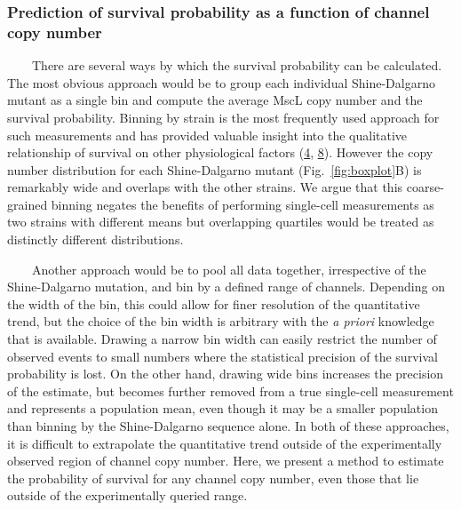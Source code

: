 \subsubsection{Prediction
of
survival
probability
as a
function
of
channel
copy
number}\label{prediction-of-survival-probability-as-a-function-of-channel-copy-number}

~~~~There
are
several
ways
by
which
the
survival
probability
can be
calculated.
The
most
obvious
approach
would
be to
group
each
individual
Shine-Dalgarno
mutant
as a
single
bin
and
compute
the
average
MscL
copy
number
and
the
survival
probability.
Binning
by
strain
is the
most
frequently
used
approach
for
such
measurements
and
has
provided
valuable
insight
into
the
qualitative
relationship
of
survival
on
other
physiological
factors
(\protect\hyperlink{ref-bialecka-fornal2015}{4},
\protect\hyperlink{ref-vandenberg2016}{8}).
However
the
copy
number
distribution
for
each
Shine-Dalgarno
mutant
(Fig.~\ref{fig:boxplot}B)
is
remarkably
wide
and
overlaps
with
the
other
strains.
We
argue
that
this
coarse-grained
binning
negates
the
benefits
of
performing
single-cell
measurements
as two
strains
with
different
means
but
overlapping
quartiles
would
be
treated
as
distinctly
different
distributions.

~~~~Another
approach
would
be to
pool
all
data
together,
irrespective
of the
Shine-Dalgarno
mutation,
and
bin by
a
defined
range
of
channels.
Depending
on the
width
of the
bin,
this
could
allow
for
finer
resolution
of the
quantitative
trend,
but
the
choice
of the
bin
width
is
arbitrary
with
the
\emph{a
priori}
knowledge
that
is
available.
Drawing
a
narrow
bin
width
can
easily
restrict
the
number
of
observed
events
to
small
numbers
where
the
statistical
precision
of the
survival
probability
is
lost.
On the
other
hand,
drawing
wide
bins
increases
the
precision
of the
estimate,
but
becomes
further
removed
from a
true
single-cell
measurement
and
represents
a
population
mean,
even
though
it may
be a
smaller
population
than
binning
by the
Shine-Dalgarno
sequence
alone.
In
both
of
these
approaches,
it is
difficult
to
extrapolate
the
quantitative
trend
outside
of the
experimentally
observed
region
of
channel
copy
number.
Here,
we
present
a
method
to
estimate
the
probability
of
survival
for
any
channel
copy
number,
even
those
that
lie
outside
of the
experimentally
queried
range.

